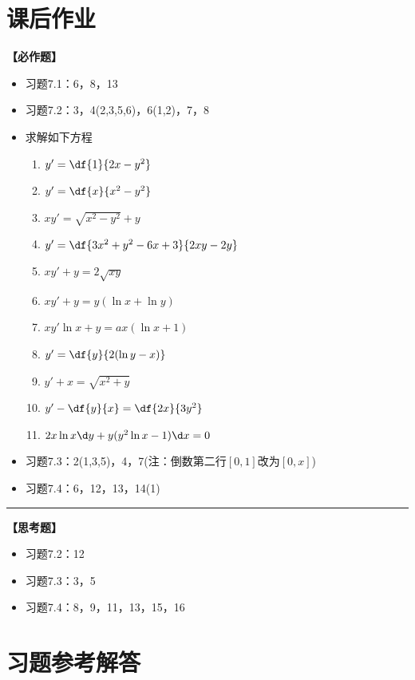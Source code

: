 \section*{课后作业}


{\bf 【必作题】}

\begin{itemize}
  \setlength{\itemindent}{1cm}
  \item 习题7.1：6，8，13
  \item 习题7.2：3，4(2,3,5,6)，6(1,2)，7，8
  \item 求解如下方程
	\begin{enumerate}[(1)]
	  \setlength{\itemindent}{1cm}
	  \item $y'=\df{1}{2x-y^2}$
	  \item $y'=\df{x}{x^2-y^2}$
	  \item $xy'=\sqrt{x^2-y^2}+y$
	  \item $y'=\df{3x^2+y^2-6x+3}{2xy-2y}$
	  \item $xy'+y=2\sqrt{xy}$
	  \item $xy'+y=y(\ln x+\ln y) $
	  \item $xy'\ln x+y=ax(\ln x+1)$
	  \item $y'=\df{y}{2(\ln y-x)}$
	  \item $y'+x=\sqrt{x^2+y}$
	  \item $y'-\df{y}{x}=\df{2x}{3y^2}$
	  \item $2x\ln x\d y+y(y^2\ln x-1)\d x=0$
	\end{enumerate}
  \item 习题7.3：2(1,3,5)，4，7(注：倒数第二行$[0,1]$改为$[0,x]$)
  \item 习题7.4：6，12，13，14(1)
  
\end{itemize}

\bigskip

\hrule

\bigskip
\bigskip

{\bf 【思考题】}

\begin{itemize}
  \setlength{\itemindent}{1cm}
  \item 习题7.2：12
  \item 习题7.3：3，5
  \item 习题7.4：8，9，11，13，15，16
\end{itemize}

\newpage

\section*{习题参考解答}

